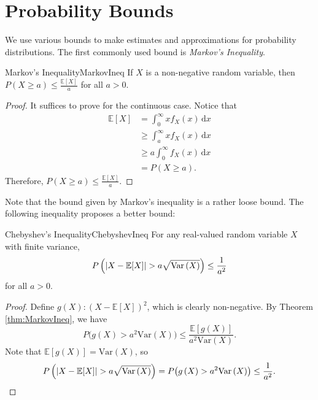 \documentclass[math, code]{amznotes}
\theoremstyle{remark}
\renewcommand{\d}{\mathrm{d}}
\begin{document}
\section{Probability Bounds}
We use various bounds to make estimates and approximations for probability distributions. The first commonly used bound is \textit{Markov's Inequality}.
\begin{thmbox}{Markov's Inequality}{MarkovIneq}
    If $X$ is a non-negative random variable, then $P\left(X \geq a\right) \leq \frac{\mathbb{E}[X]}{a}$ for all $a > 0$.
    \tcblower
    \begin{proof}
        It suffices to prove for the continuous case. Notice that 
        \begin{align*}
            \mathbb{E}[X] & = \int_{0}^{\infty}\!xf_X\left(x\right)\,\d x \\
            & \geq \int_{a}^{\infty}\!xf_X\left(x\right)\,\d x \\
            & \geq a\int_{0}^{\infty}\!f_X\left(x\right)\,\d x \\
            & = P\left(X \geq a\right).
        \end{align*}
        Therefore, $P\left(X \geq a\right) \leq \frac{\mathbb{E}[X]}{a}$.
    \end{proof}
\end{thmbox}
Note that the bound given by Markov's inequality is a rather loose bound. The following inequality proposes a better bound:
\begin{thmbox}{Chebyshev's Inequality}{ChebyshevIneq}
    For any real-valued random variable $X$ with finite variance, 
    \begin{equation*}
        P\left({\left\lvert {X - \mathbb{E}[X]} \right\rvert} > a\sqrt{\mathrm{Var}\left(X\right)}\right) \leq \frac{1}{a^2}
    \end{equation*}
    for all $a > 0$.
    \tcblower
    \begin{proof}
        Define $g\left(X\right) \colon \left(X - \mathbb{E}[X]\right)^2$, which is clearly non-negative. By Theorem \ref{thm:MarkovIneq}, we have 
        \begin{equation*}
            P\bigl(g\left(X\right) > a^2\mathrm{Var}\left(X\right)\bigr) \leq \frac{\mathbb{E}[g\left(X\right)]}{a^2\mathrm{Var}\left(X\right)}.
        \end{equation*}
        Note that $\mathbb{E}[g\left(X\right)] = \mathrm{Var}\left(X\right)$, so 
        \begin{equation*}
            P\left({\left\lvert {X - \mathbb{E}[X]} \right\rvert} > a\sqrt{\mathrm{Var}\left(X\right)}\right) = P\bigl(g\left(X\right) > a^2\mathrm{Var}\left(X\right)\bigr) \leq \frac{1}{a^2}.
        \end{equation*}
    \end{proof}
\end{thmbox}
\end{document}
